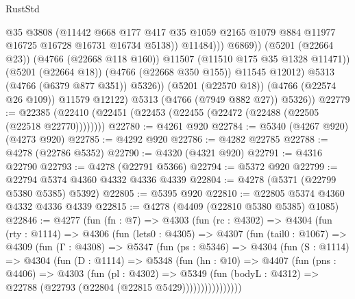\begin{lexlean}{RustStd}
\begin{coremodule}
                              @35
                              @3808
                              (@11442
                                @668
                                @177
                                @417
                                @35
                                @1059
                                @2165
                                @1079
                                @884
                                @11977
                                @16725
                                @16728
                                @16731
                                @16734
                                @5138))
                            @11484)))
                      @6869))
                  (@5201 (@22664 @23))
                  (@4766 (@22668 @118 @160))
                  @11507
                  (@11510 @175 @35 @1328 @11471))
                (@5201 (@22664 @18))
                (@4766 (@22668 @350 @155))
                @11545
                @12012)
              @5313
              (@4766 (@6379 @877 @351))
              @5326))
          (@5201 (@22570 @18))
          (@4766 (@22574 @26 @109))
          @11579
          @12122)
        @5313
        (@4766 (@7949 @882 @27))
        @5326))
@22779 := @22385 (@22410 (@22451 (@22453 (@22455 (@22472 (@22488 (@22505 (@22518 @22770))))))))
@22780 := @4261 @920
@22784 := @5340 (@4267 @920) (@4273 @920)
@22785 := @4292 @920
@22786 := @4282 @22785
@22788 := @4278 (@22786 @5352)
@22790 := @4320 (@4321 @920)
@22791 := @4316 @22790
@22793 := @4278 (@22791 @5366)
@22794 := @5372 @920
@22799 := @22794 @5374 @4360 @4332 @4336 @4339
@22804 := @4278 (@5371 (@22799 @5380 @5385) @5392)
@22805 := @5395 @920
@22810 := @22805 @5374 @4360 @4332 @4336 @4339
@22815 := @4278 (@4409 (@22810 @5380 @5385) @1085)
@22846 := @4277
    (fun (fn : @7) =>
    @4303
      (fun (rc : @4302) =>
      @4304
        (fun (rty : @1114) =>
        @4306
          (fun (lets0 : @4305) =>
          @4307
            (fun (tail0 : @1067) =>
            @4309
              (fun (Γ : @4308) =>
              @5347
                (fun (ps : @5346) =>
                @4304
                  (fun (S : @1114) =>
                  @4304
                    (fun (D : @1114) =>
                    @5348
                      (fun (hn : @10) =>
                      @4407
                        (fun (pns : @4406) =>
                        @4303
                          (fun (pl : @4302) =>
                          @5349
                            (fun (bodyL : @4312) =>
                            @22788 (@22793 (@22804 (@22815 @5429))))))))))))))))

\end{coremodule}
\end{lexlean}
